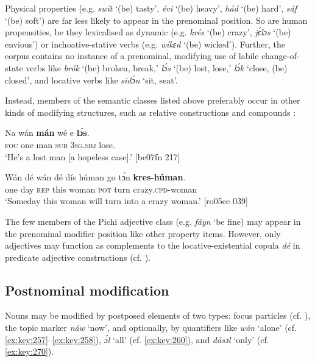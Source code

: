 Physical properties (e.g. \textit{swít} ‘(be) tasty’, \textit{évi} ‘(be) heavy’, \textit{hád} ‘(be) hard’, \textit{sáf} ‘(be) soft’) are far less likely to appear in the prenominal position. So are human propensities, be they lexicalised as dynamic (e.g. \textit{krés} ‘(be) crazy’, \textit{jɛ́lɔs} ‘(be) envious’) or inchoative-stative verbs (e.g. \textit{wíkɛd} ‘(be) wicked’). Further, the corpus contains no instance of a prenominal, modifying use of labile{\fff} change-of-state verbs like \textit{brók} ‘(be) broken, break,’ \textit{lɔ́s} ‘(be) lost, lose,’ \textit{lɔ́k} ‘close, (be) closed’, and locative verbs{\fff} like \textit{sidɔ́n} ‘sit, seat’. 


Instead, members of the semantic classes listed above preferably occur in other kinds of modifying structures, such as relative constructions  and compounds : 



\ea%
    \label{ex:key:235}
    \gll Na  wán    \textbf{mán} wé  e    \textbf{lɔ́s}.\\
\textsc{foc}  one    man    \textsc{sub}  \textsc{3sg.sbj}  lose.\\

\glt ‘He’s a lost man [a hopeless case].’ [be07fn 217]
\z


\ea%
    \label{ex:key:236}
    \gll Wán    dé  {wán  dé}  dís  húman  go  tɔ́n  \textbf{kres-húman}.\\
one    day  \textsc{rep}      this  woman  \textsc{pot}  turn  crazy.\textsc{cpd}{}-woman\\

\glt ‘Someday this woman will turn into a crazy woman.’ [ro05ee 039]
\z

The few members of the Pichi adjective class (e.g. \textit{fáyn} ‘be fine) may appear in the prenominal modifier position like other property items. However, only adjectives may function as complements to the locative-existential copula \textit{dé} in predicate adjective constructions (cf. ).

\subsection{Postnominal modification}

Nouns may be modified by postposed elements of two types: focus particles (cf. ), the topic marker \textit{náw} ‘now’, and optionally, by quantifiers like \textit{wán} ‘alone’ (cf. \ref{ex:key:257}–\ref{ex:key:258}), \textit{ɔ́l} ‘all’ (cf. \ref{ex:key:260}), and \textit{dásɔl} ‘only’ (cf. \ref{ex:key:270}). 

